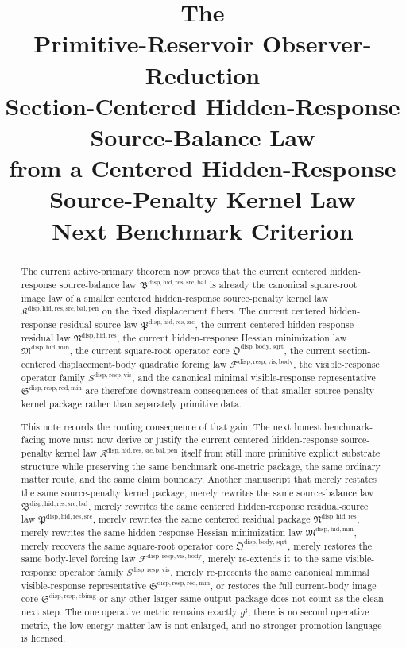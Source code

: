 \documentclass[11pt]{article}
\title{\textbf{The \TheoryName{}}\\[0.4em]
\large Primitive-Reservoir Observer-Reduction\\
\large Section-Centered Hidden-Response\\
\large Source-Balance Law\\
\large from a Centered Hidden-Response\\
\large Source-Penalty Kernel Law\\
\large Next Benchmark Criterion}
\author{}
\date{}
\newcommand{\CompletedMetric}{g^{\sharp}}
\newcommand{\SourcePenaltyKernelLawPackage}{\mathfrak K^{\mathrm{disp,hid,res,src,bal,pen}}}
\newcommand{\SourceBalanceLawPackage}{\mathfrak B^{\mathrm{disp,hid,res,src,bal}}}
\newcommand{\ResidualSourceLawPackage}{\mathfrak P^{\mathrm{disp,hid,res,src}}}
\newcommand{\ResidualLawPackage}{\mathfrak N^{\mathrm{disp,hid,res}}}
\newcommand{\HiddenMinimizationPackage}{\mathfrak M^{\mathrm{disp,hid,min}}}
\newcommand{\SquareRootOperatorCore}{\mathfrak O^{\mathrm{disp,body,sqrt}}}
\newcommand{\VisibleBodyForcingLaw}{\mathscr F^{\mathrm{disp,resp,vis,body}}}
\newcommand{\VisibleResponseOperator}{S^{\mathrm{disp,resp,vis}}}
\newcommand{\MinimalReducedStructure}{\mathfrak S^{\mathrm{disp,resp,red,min}}}
\newcommand{\CurrentBodyImageCore}{\mathfrak S^{\mathrm{disp,resp,cbimg}}}
\begin{document}
\maketitle

\begin{abstract}
The current active-primary theorem now proves that the current centered hidden-response source-balance law \(\SourceBalanceLawPackage\) is already the canonical square-root image law of a smaller centered hidden-response source-penalty kernel law \(\SourcePenaltyKernelLawPackage\) on the fixed displacement fibers. The current centered hidden-response residual-source law \(\ResidualSourceLawPackage\), the current centered hidden-response residual law \(\ResidualLawPackage\), the current hidden-response Hessian minimization law \(\HiddenMinimizationPackage\), the current square-root operator core \(\SquareRootOperatorCore\), the current section-centered displacement-body quadratic forcing law \(\VisibleBodyForcingLaw\), the visible-response operator family \(\VisibleResponseOperator\), and the canonical minimal visible-response representative \(\MinimalReducedStructure\) are therefore downstream consequences of that smaller source-penalty kernel package rather than separately primitive data.

This note records the routing consequence of that gain. The next honest benchmark-facing move must now derive or justify the current centered hidden-response source-penalty kernel law \(\SourcePenaltyKernelLawPackage\) itself from still more primitive explicit substrate structure while preserving the same benchmark one-metric package, the same ordinary matter route, and the same claim boundary. Another manuscript that merely restates the same source-penalty kernel package, merely rewrites the same source-balance law \(\SourceBalanceLawPackage\), merely rewrites the same centered hidden-response residual-source law \(\ResidualSourceLawPackage\), merely rewrites the same centered residual package \(\ResidualLawPackage\), merely rewrites the same hidden-response Hessian minimization law \(\HiddenMinimizationPackage\), merely recovers the same square-root operator core \(\SquareRootOperatorCore\), merely restores the same body-level forcing law \(\VisibleBodyForcingLaw\), merely re-extends it to the same visible-response operator family \(\VisibleResponseOperator\), merely re-presents the same canonical minimal visible-response representative \(\MinimalReducedStructure\), or restores the full current-body image core \(\CurrentBodyImageCore\) or any other larger same-output package does not count as the clean next step. The one operative metric remains exactly \(\CompletedMetric\), there is no second operative metric, the low-energy matter law is not enlarged, and no stronger promotion language is licensed.
\end{abstract}
\end{document}
